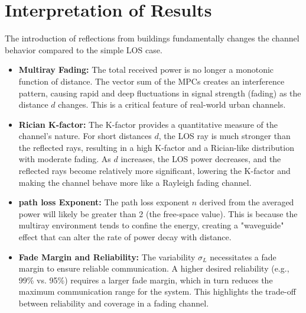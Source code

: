 \section{Interpretation of Results}
The introduction of reflections from buildings fundamentally changes the channel behavior compared to the simple LOS case.
\begin{itemize}
	\item \textbf{Multiray Fading:} The total received power is no longer a monotonic function of distance. The vector sum of the MPCs creates an interference pattern, causing rapid and deep fluctuations in signal strength (fading) as the distance $d$ changes. This is a critical feature of real-world urban channels.
	\item \textbf{Rician K-factor:} The K-factor provides a quantitative measure of the channel's nature. For short distances $d$, the LOS ray is much stronger than the reflected rays, resulting in a high K-factor and a Rician-like distribution with moderate fading. As $d$ increases, the LOS power decreases, and the reflected rays become relatively more significant, lowering the K-factor and making the channel behave more like a Rayleigh fading channel.
	\item \textbf{path loss Exponent:} The path loss exponent $n$ derived from the averaged power will likely be greater than 2 (the free-space value). This is because the multiray environment tends to confine the energy, creating a "waveguide" effect that can alter the rate of power decay with distance.
	\item \textbf{Fade Margin and Reliability:} The variability $\sigma_L$ necessitates a fade margin to ensure reliable communication. A higher desired reliability (e.g., 99\% vs. 95\%) requires a larger fade margin, which in turn reduces the maximum communication range for the system. This highlights the trade-off between reliability and coverage in a fading channel.
\end{itemize}
